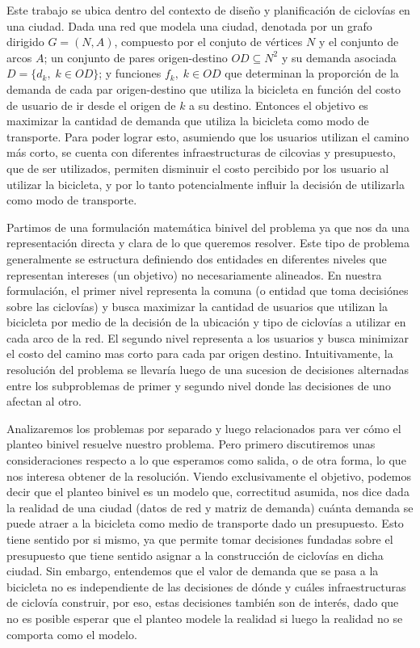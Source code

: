 \documentclass{article}
\begin{document}
  Este trabajo se ubica dentro del contexto de diseño y planificación de ciclovías en una ciudad. Dada una red que modela una ciudad, denotada por un grafo dirigido $G=(N,A)$, compuesto por el conjuto de vértices $N$ y el conjunto de arcos $A$; un conjunto de pares origen-destino $OD \subseteq N^2$ y su demanda asociada $D = \{d_k,\; k \in OD\}$; y funciones $f_k,\;k \in OD$ que determinan la proporción de la demanda de cada par origen-destino que utiliza la bicicleta en función del costo de usuario de ir desde el origen de $k$ a su destino. Entonces el objetivo es maximizar la cantidad de demanda que utiliza la bicicleta como modo de transporte. Para poder lograr esto, asumiendo que los usuarios utilizan el camino más corto, se cuenta con diferentes infraestructuras de cilcovias y presupuesto, que de ser utilizados, permiten disminuir el costo percibido por los usuario al utilizar la bicicleta, y por lo tanto potencialmente influir la decisión de utilizarla como modo de transporte.

  Partimos de una formulación matemática binivel del problema ya que nos da una representación directa y clara de lo que queremos resolver. Este tipo de problema generalmente se estructura definiendo dos entidades en diferentes niveles que representan intereses (un objetivo) no necesariamente alineados. En nuestra formulación, el primer nivel representa la comuna (o entidad que toma decisiónes sobre las ciclovías) y busca maximizar la cantidad de usuarios que utilizan la bicicleta por medio de la decisión de la ubicación y tipo de ciclovías a utilizar en cada arco de la red. El segundo nivel representa a los usuarios y busca minimizar el costo del camino mas corto para cada par origen destino. Intuitivamente, la resolución del problema se llevaría luego de una sucesion de decisiones alternadas entre los subproblemas de primer y segundo nivel donde las decisiones de uno afectan al otro.

  Analizaremos los problemas por separado y luego relacionados para ver cómo el planteo binivel resuelve nuestro problema. Pero primero discutiremos unas consideraciones respecto a lo que esperamos como salida, o de otra forma, lo que nos interesa obtener de la resolución. Viendo exclusivamente el objetivo, podemos decir que el planteo binivel es un modelo que, correctitud asumida, nos dice dada la realidad de una ciudad (datos de red y matriz de demanda) cuánta demanda se puede atraer a la bicicleta como medio de transporte dado un presupuesto. Esto tiene sentido por si mismo, ya que permite tomar decisiones fundadas sobre el presupuesto que tiene sentido asignar a la construcción de ciclovías en dicha ciudad. Sin embargo, entendemos que el valor de demanda que se pasa a la bicicleta no es independiente de las decisiones de dónde y cuáles infraestructuras de ciclovía construir, por eso, estas decisiones también son de interés, dado que no es posible esperar que el planteo modele la realidad si luego la realidad no se comporta como el modelo.
\end{document}
